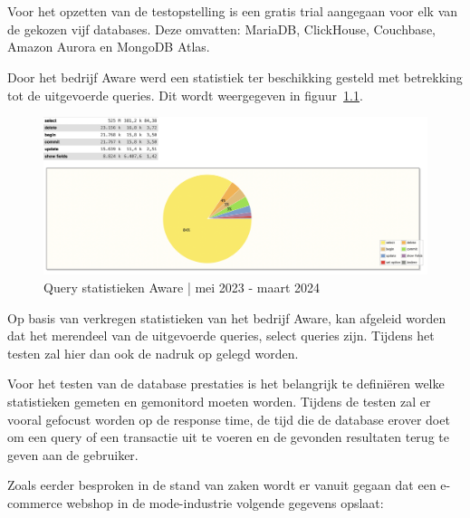 \chapter{}%
\label{ch:onderzoek}

\section{}%
\label{sec:testopstelling}

Voor het opzetten van de testopstelling is een gratis trial aangegaan voor elk van de gekozen vijf databases. Deze omvatten: MariaDB, ClickHouse, Couchbase, Amazon Aurora en MongoDB Atlas.

Door het bedrijf Aware werd een statistiek ter beschikking gesteld met betrekking tot de uitgevoerde queries. Dit wordt weergegeven in figuur~\ref{fig:statistics}.

\begin{figure}[H]
    \centering
    \includegraphics[width=\linewidth]{graphics/statistics}
    \caption[Query statistieken Aware]{Query statistieken Aware | mei 2023 - maart 2024}
    \label{fig:statistics}
\end{figure}

Op basis van verkregen statistieken van het bedrijf Aware, kan afgeleid worden dat het merendeel van de uitgevoerde queries, select queries zijn. Tijdens het testen zal hier dan ook de nadruk op gelegd worden. 

Voor het testen van de database prestaties is het belangrijk te definiëren welke statistieken gemeten en gemonitord moeten worden. Tijdens de testen zal er vooral gefocust worden op de response time, de tijd die de database erover doet om een query of een transactie uit te voeren en de gevonden resultaten terug te geven aan de gebruiker. 

Zoals eerder besproken in de stand van zaken wordt er vanuit gegaan dat een e-commerce webshop in de mode-industrie volgende gegevens opslaat: 

